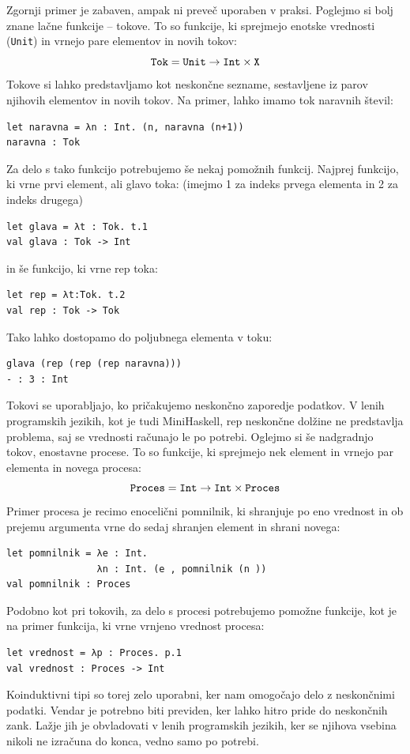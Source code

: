 \documentclass[a4paper,12pt,openright]{book}
\begin{document}
Zgornji primer je zabaven, ampak ni preveč uporaben v praksi. Poglejmo si bolj znane lačne funkcije -- tokove. To so funkcije, ki sprejmejo enotske vrednosti (\lstinline{Unit}) in vrnejo pare elementov in novih tokov:
\begin{equation}
    \mathtt{Tok} = \mathtt{Unit} \rightarrow \mathtt{Int} \times \mathtt{X} \notag
\end{equation}
Tokove si lahko predstavljamo kot neskončne sezname, sestavljene iz parov njihovih elementov in novih tokov. Na primer, lahko imamo tok naravnih števil:
\begin{lstlisting}
let naravna = λn : Int. (n, naravna (n+1))
naravna : Tok
\end{lstlisting}
Za delo s tako funkcijo potrebujemo še nekaj pomožnih funkcij. Najprej funkcijo, ki vrne prvi element, ali glavo toka: (imejmo 1 za indeks prvega elementa in 2 za indeks drugega)
\begin{lstlisting}
let glava = λt : Tok. t.1
val glava : Tok -> Int
\end{lstlisting}
in še funkcijo, ki vrne rep toka:
\begin{lstlisting}
let rep = λt:Tok. t.2
val rep : Tok -> Tok
\end{lstlisting}
Tako lahko dostopamo do poljubnega elementa v toku:
\begin{lstlisting}
glava (rep (rep (rep naravna)))
- : 3 : Int
\end{lstlisting}
Tokovi se uporabljajo, ko pričakujemo neskončno zaporedje podatkov. V lenih programskih jezikih, kot je tudi MiniHaskell, rep neskončne dolžine
ne predstavlja problema, saj se vrednosti računajo le po potrebi.
Oglejmo si še nadgradnjo tokov, enostavne procese. To so funkcije, ki sprejmejo nek element in vrnejo par elementa in novega procesa:
\begin{equation}
    \mathtt{Proces} = \mathtt{Int} \rightarrow \mathtt{Int} \times \mathtt{Proces} \notag
\end{equation}
Primer procesa je recimo enocelični pomnilnik, ki shranjuje po eno vrednost in ob prejemu argumenta vrne do sedaj shranjen element in shrani novega:
\begin{lstlisting}
let pomnilnik = λe : Int. 
                λn : Int. (e , pomnilnik (n ))
val pomnilnik : Proces  
\end{lstlisting}
Podobno kot pri tokovih, za delo s procesi potrebujemo pomožne funkcije, kot je na primer funkcija, ki vrne vrnjeno vrednost procesa:
\begin{lstlisting}
let vrednost = λp : Proces. p.1
val vrednost : Proces -> Int  
\end{lstlisting}
Koinduktivni tipi so torej zelo uporabni, ker nam omogočajo delo z neskončnimi podatki. Vendar je potrebno biti previden, ker lahko hitro pride do neskončnih zank. 
Lažje jih je obvladovati v lenih programskih jezikih, ker se njihova vsebina nikoli ne izračuna do konca, vedno samo po potrebi.
\end{document}

